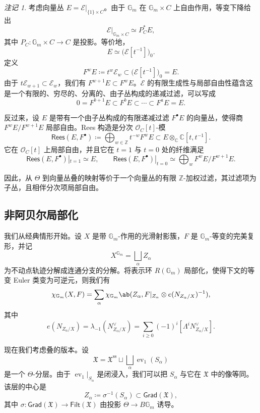 \documentclass{amsart}
\theoremstyle{definition}
\theoremstyle{remark}
\newtheorem{rmk}[thm]{注记}
\theoremstyle{plain}
\theoremstyle{definition}
\theoremstyle{remark}
\newcommand{\G}{\mathbb{G}}
\newcommand{\C}{\mathbb{C}}
\newcommand{\Z}{\mathbb{Z}}
\newcommand{\mc}[1]{\mathcal{#1}}
\newcommand{\mf}[1]{\mathfrak{#1}}
\newcommand{\mr}[1]{\mathrm{#1}}
\newcommand{\ms}[1]{\mathsf{#1}}
\newcommand{\1}{\mathbf{1}}
\newcommand{\2}{\mathbf{2}}
\newcommand{\3}{\mathbf{3}}
\DeclareMathOperator{\ev}{ev}
\begin{document}
\begin{rmk}
    考虑向量丛 \(E=\mc{E}|_{\{1\}\times C}\)。由于 \(\G_m\) 在 \(\G_m\times C\) 上自由作用，等变下降给出
    \[
        \mc{E}|_{\G_m\times C}\simeq P_C^*E,
    \]
    其中 \(P_C\colon\G_m\times C\to C\) 是投影。等价地，
    \[
        E\simeq\big(\mc{E}[t^{-1}]\big)_0.
    \]
    定义
    \[
        F^wE\coloneqq t^w\mc{E}_w\subset\big(\mc{E}[t^{-1}]\big)_0=E.
    \]
    由于 \(t\mc{E}_{w+1}\subset\mc{E}_w\)，我们有 \(F^{w+1}E\subset F^wE\)。\(\mc{E}\) 的有限生成性与局部自由性蕴含这是一个有限的、穷尽的、分离的、由子丛构成的递减过滤，可以写成
    \[
        0=F^{b+1}E\subset F^bE\subset\cdots\subset F^aE=E.
    \]

    反过来，设 \(E\) 是带有一个由子丛构成的有限递减过滤 \(F^\bullet E\) 的向量丛，使得商 \(F^wE/F^{w+1}E\) 局部自由。Rees 构造是分次 \(\mc{O}_C[t]\)-模
    \[
        \ms{Rees}(E,F^\bullet)
        \coloneqq
        \bigoplus_{w\in\Z}t^{-w}F^wE
        \subset
        E\otimes_{\C}\C[t,t^{-1}].
    \]
    它在 \(\mc{O}_C[t]\) 上局部自由，并且它在 \(t=1\) 与 \(t=0\) 处的纤维满足
    \[
        \ms{Rees}(E,F^\bullet)|_{t=1}\simeq E,
        \qquad
        \ms{Rees}(E,F^\bullet)|_{t=0}
        \simeq
        \bigoplus_w F^wE/F^{w+1}E.
    \]
\end{rmk}

因此，从 \(\Theta\) 到向量丛叠的映射等价于一个向量丛的有限 \(\Z\)-加权过滤，其过滤项为子丛，且相伴分次项局部自由。


\subsection{非阿贝尔局部化}%
\label{sub:Non-abelian localization}

我们从经典情形开始。设 \(X\) 是带 \(\G_m\)-作用的光滑射影簇，\(F\) 是 \(\G_m\)-等变的完美复形，并记
\[
    X^{\G_m}=\bigsqcup_\alpha Z_\alpha
\]
为不动点轨迹分解成连通分支的分解。将表示环 \(R(\G_m)\) 局部化，使得下文的等变 Euler 类变为可逆元，则我们有
\[
    \chi_{\G_m}(X,F)
    =
    \sum_\alpha
    \chi_{\G_m}\ab(
        Z_\alpha,
        F|_{Z_\alpha}\otimes e(N_{Z_\alpha/X})^{-1}
    ),
\]
其中
\[
    e(N_{Z_\alpha/X})
    =
    \lambda_{-1}(N_{Z_\alpha/X}^\vee)
    =
    \sum_{i\geq0}(-1)^i[\Lambda^iN_{Z_\alpha/X}^\vee].
\]

现在我们考虑叠的版本。设
\[
    \mf{X}
    =
    \mf{X}^{\mr{ss}}
    \sqcup
    \bigsqcup_\alpha\ev_1(S_\alpha)
\]
是一个 \(\Theta\)-分层。由于 \(\ev_1|_{S_\alpha}\) 是闭浸入，我们可以把 \(S_\alpha\) 与它在 \(\mf{X}\) 中的像等同。该层的中心是
\[
    Z_\alpha\coloneqq\sigma^{-1}(S_\alpha)\subset\ms{Grad}(\mf{X}),
\]
其中 \(\sigma\colon\ms{Grad}(\mf{X})\to\ms{Filt}(\mf{X})\) 由投影 \(\Theta\to B\G_m\) 诱导。
\end{document}
